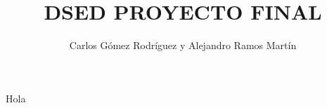\documentclass{article}
\title{DSED PROYECTO FINAL}
\author{Carlos Gómez Rodríguez y Alejandro Ramos Martín}
\begin{document}
\maketitle
Hola
\end{document}
